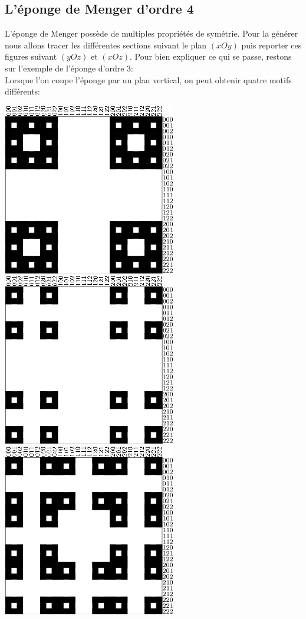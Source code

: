 \subsection{L'éponge de Menger d'ordre 4}
L'éponge de Menger possède de multiples propriétés de symétrie. Pour la générer nous allons tracer les différentes sections suivant le plan $(xOy)$ puis reporter ces figures suivant $(yOz)$ et $(xOz)$. Pour bien expliquer ce qui se passe, restons sur l'exemple de l'éponge d'ordre 3:\\
Lorsque l'on coupe l'éponge par un plan vertical, on peut obtenir quatre motifs différents:\\
\vspace*{0.6cm}
 \begin{center}
\includegraphics{images/menger-schema07.png}\\ \vspace{0.5cm}
\includegraphics{images/menger-schema08.png}\\ \vspace{0.5cm}
\includegraphics{images/menger-schema09.png}\\ \vspace{0.5cm}

\end{center}

